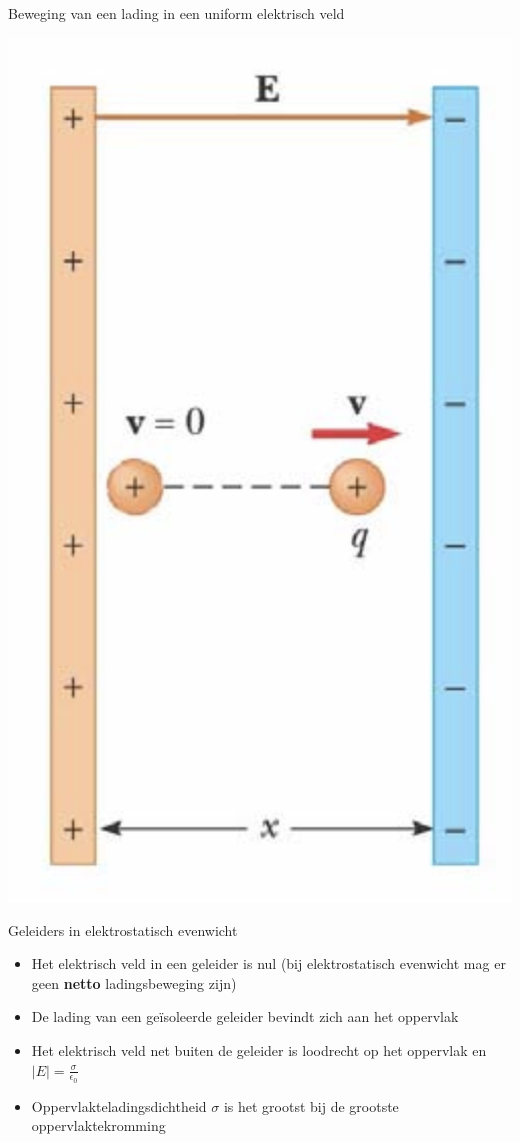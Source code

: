 \begin{app}{Beweging van een lading in een uniform elektrisch veld}
\begin{minipage}{.30\textwidth}
        \includegraphics[scale = 0.3]{Images/Elektriciteit/UniformE.png}
    \end{minipage}

\end{app}

\begin{pro}{Geleiders in elektrostatisch evenwicht}
    \begin{itemize}
        \item Het elektrisch veld in een geleider is nul (bij elektrostatisch evenwicht mag er geen \textbf{netto} ladingsbeweging zijn)
        \item De lading van een geïsoleerde geleider bevindt zich aan het oppervlak
        \item Het elektrisch veld net buiten de geleider is loodrecht op het oppervlak en $|E| = \tfrac{\sigma}{\epsilon_0}$
        \item Oppervlakteladingsdichtheid $\sigma$ is het grootst bij de grootste oppervlaktekromming
    \end{itemize}
\end{pro}

